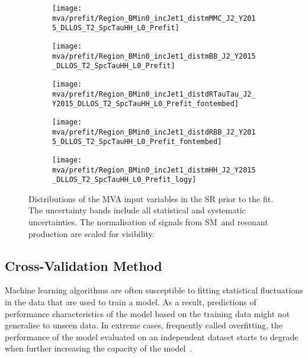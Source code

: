 \begin{figure}[htbp]
  \centering

  \begin{subfigure}[t]{.46\textwidth}
    \texttt{[image: mva/prefit/Region\_BMin0\_incJet1\_distmMMC\_J2\_Y2015\_DLLOS\_T2\_SpcTauHH\_L0\_Prefit]}
  \end{subfigure}\hfill %
  \begin{subfigure}[t]{.46\textwidth}
    \texttt{[image: mva/prefit/Region\_BMin0\_incJet1\_distmBB\_J2\_Y2015\_DLLOS\_T2\_SpcTauHH\_L0\_Prefit]}
  \end{subfigure}

  \begin{subfigure}[t]{.46\textwidth}
    \texttt{[image: mva/prefit/Region\_BMin0\_incJet1\_distdRTauTau\_J2\_Y2015\_DLLOS\_T2\_SpcTauHH\_L0\_Prefit\_fontembed]}
  \end{subfigure}\hfill %
  \begin{subfigure}[t]{.46\textwidth}
    \texttt{[image: mva/prefit/Region\_BMin0\_incJet1\_distdRBB\_J2\_Y2015\_DLLOS\_T2\_SpcTauHH\_L0\_Prefit\_fontembed]}
  \end{subfigure}

  \begin{subfigure}[t]{.46\textwidth}
    \texttt{[image: mva/prefit/Region\_BMin0\_incJet1\_distmHH\_J2\_Y2015\_DLLOS\_T2\_SpcTauHH\_L0\_Prefit\_logy]}
  \end{subfigure}

  \caption[Distributions of the MVA input variables in the \hadhad SR prior to
  the fit.]{Distributions of the MVA input variables in the \hadhad SR prior to
    the fit. The uncertainty bands include all statistical and systematic
    uncertainties. The normalisation of signals from SM~\HH and resonant \HH
    production are scaled for visibility.}%
  \label{fig:mva_inputs}
\end{figure}


\subsection{Cross-Validation Method}
\label{sec:mva_crossvalidation}

Machine learning algorithms
are often susceptible to fitting statistical fluctuations in the data that are
used to train a model. As a result, predictions of performance characteristics
of the model based on the training data might not generalise to unseen data. In
extreme cases, frequently called overfitting, the performance of the model
evaluated on an independent dataset starts to degrade when further increasing
the capacity of the model~\cite{hastie09}.

